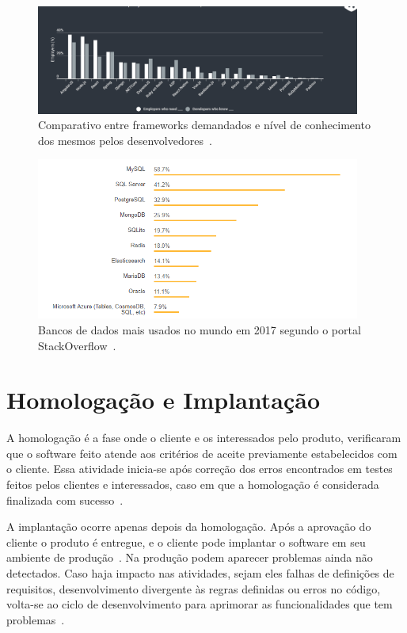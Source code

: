 \begin{figure}[htp]
    \centering
    \includegraphics[width=0.95\textwidth]{figuras/figura003.png}
    \caption{Comparativo entre frameworks demandados e nível de conhecimento dos mesmos pelos desenvolvedores~\cite{linguagemEframework}.}
    \label{Figura003}
\end{figure}

\begin{figure}[htp]
    \centering
    \includegraphics[width=0.95\textwidth]{figuras/figura004.png}
    \caption{Bancos de dados mais usados no mundo em 2017 segundo o portal StackOverflow~\cite{bancomaisusado}.}
    \label{Figura004}
\end{figure}

\section{Homologação e Implantação}

A homologação é a fase onde o cliente e os interessados pelo produto, verificaram que o software feito atende aos critérios de aceite previamente estabelecidos com o cliente. 
Essa atividade inicia-se após correção dos erros encontrados em testes feitos pelos clientes e interessados, caso em que a homologação é considerada finalizada com sucesso~\cite{santos2017cp}.

A implantação ocorre apenas depois da homologação.
Após a aprovação do cliente o produto é entregue, e o cliente pode implantar o software em seu ambiente de produção~\cite{pressman2016engenharia}.
Na produção podem aparecer problemas ainda não detectados.
Caso haja impacto nas atividades, sejam eles falhas de definições de requisitos, desenvolvimento divergente às regras definidas ou erros no código, volta-se ao ciclo de desenvolvimento para aprimorar as funcionalidades que tem problemas~\cite{salvador2015processo}.

